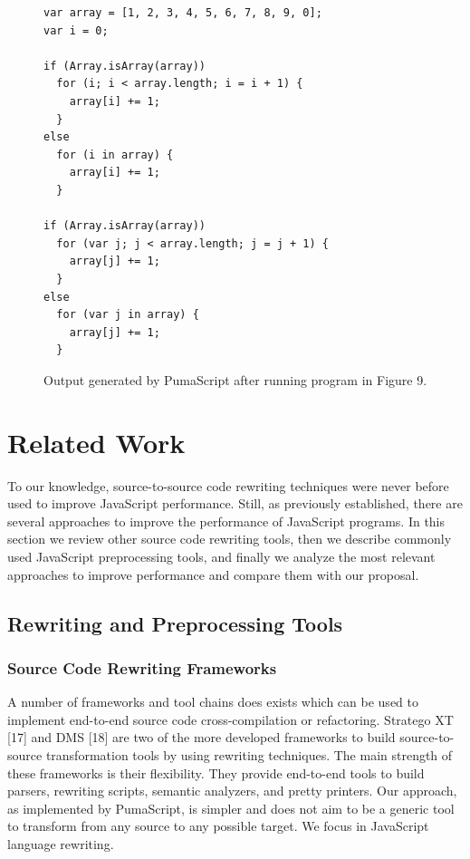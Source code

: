 \documentclass[preprint,10pt]{sigplanconf}
\begin{document}

\begin{figure}
\begin{lstlisting}
var array = [1, 2, 3, 4, 5, 6, 7, 8, 9, 0];
var i = 0;

if (Array.isArray(array))
  for (i; i < array.length; i = i + 1) {
    array[i] += 1;
  }
else
  for (i in array) {
    array[i] += 1;
  }
  
if (Array.isArray(array))
  for (var j; j < array.length; j = j + 1) {
    array[j] += 1;
  }
else
  for (var j in array) {
    array[j] += 1;
  }
\end{lstlisting}
\caption{Output generated by PumaScript after running program in Figure 9.}
\label{fig:10}
\end{figure}


\section{Related Work}
To our knowledge, source-to-source code rewriting techniques were never before used to improve JavaScript performance. Still, as previously established, there are several approaches to improve the performance of JavaScript programs. In this section we review other source code rewriting tools, then we describe commonly used JavaScript preprocessing tools, and finally we analyze the most relevant approaches to improve performance and compare them with our proposal.

\subsection{Rewriting and Preprocessing Tools}

\subsubsection{Source Code Rewriting Frameworks}

A number of frameworks and tool chains does exists which can be used to implement end-to-end source code cross-compilation or refactoring. Stratego XT [17] and DMS [18] are two of the more developed frameworks to build source-to-source transformation tools by using rewriting techniques. The main strength of these frameworks is their flexibility. They provide end-to-end tools to build parsers, rewriting scripts, semantic analyzers, and pretty printers. Our approach, as implemented by PumaScript, is simpler and does not aim to be a generic tool to transform from any source to any possible target. We focus in JavaScript language rewriting. 
\end{document}
